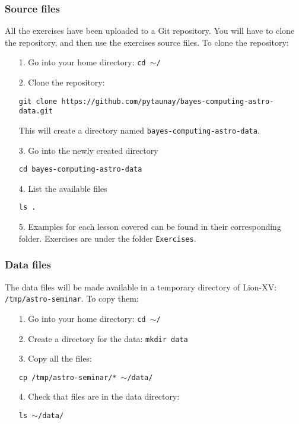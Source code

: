 \documentclass[letterpaper,10pt]{article}
\begin{document}
\subsubsection{Source files}
All the exercises have been uploaded to a Git repository. You will have to clone the repository, and then use the exercises source files. 
To clone the repository:
\begin{itemize}
 \item[1.] Go into your home directory: \texttt{cd $\sim$/}
 \item[2.] Clone the repository: 
 \begin{center}
   \texttt{git clone https://github.com/pytaunay/bayes-computing-astro-data.git}
 \end{center}
 This will create a directory named \texttt{bayes-computing-astro-data}.
 \item[3.] Go into the newly created directory
 \begin{center}
   \texttt{cd bayes-computing-astro-data}
 \end{center}
 \item[4.] List the available files
 \begin{center}
   \texttt{ls .}
 \end{center} 
 \item[5.] Examples for each lesson covered can be found in their corresponding folder. Exercises are under the folder \texttt{Exercises}.
\end{itemize}


\subsubsection{Data files}
The data files will be made available in a temporary directory of Lion-XV: \texttt{/tmp/astro-seminar}. To copy them:
\begin{itemize}
 \item[1.] Go into your home directory: \texttt{cd $\sim$/}
 \item[2.] Create a directory for the data: \texttt{mkdir data}
 \item[3.] Copy all the files:
\begin{center}
 \texttt{cp /tmp/astro-seminar/* $\sim$/data/}
\end{center}
 \item[4.] Check that files are in the data directory:
\begin{center}
 \texttt{ls $\sim$/data/}
\end{center}
\end{itemize}
\end{document}
